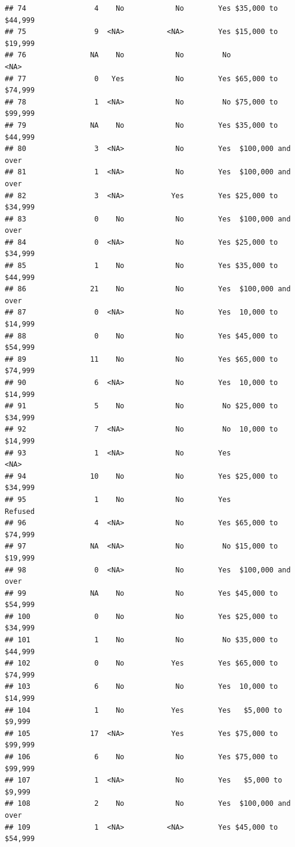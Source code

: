 \documentclass[man]{apa6}
\begin{document}
\begin{verbatim}
## 74                4    No            No        Yes $35,000 to $44,999
## 75                9  <NA>          <NA>        Yes $15,000 to $19,999
## 76               NA    No            No         No               <NA>
## 77                0   Yes            No        Yes $65,000 to $74,999
## 78                1  <NA>            No         No $75,000 to $99,999
## 79               NA    No            No        Yes $35,000 to $44,999
## 80                3  <NA>            No        Yes  $100,000 and over
## 81                1  <NA>            No        Yes  $100,000 and over
## 82                3  <NA>           Yes        Yes $25,000 to $34,999
## 83                0    No            No        Yes  $100,000 and over
## 84                0  <NA>            No        Yes $25,000 to $34,999
## 85                1    No            No        Yes $35,000 to $44,999
## 86               21    No            No        Yes  $100,000 and over
## 87                0  <NA>            No        Yes  10,000 to $14,999
## 88                0    No            No        Yes $45,000 to $54,999
## 89               11    No            No        Yes $65,000 to $74,999
## 90                6  <NA>            No        Yes  10,000 to $14,999
## 91                5    No            No         No $25,000 to $34,999
## 92                7  <NA>            No         No  10,000 to $14,999
## 93                1  <NA>            No        Yes               <NA>
## 94               10    No            No        Yes $25,000 to $34,999
## 95                1    No            No        Yes            Refused
## 96                4  <NA>            No        Yes $65,000 to $74,999
## 97               NA  <NA>            No         No $15,000 to $19,999
## 98                0  <NA>            No        Yes  $100,000 and over
## 99               NA    No            No        Yes $45,000 to $54,999
## 100               0    No            No        Yes $25,000 to $34,999
## 101               1    No            No         No $35,000 to $44,999
## 102               0    No           Yes        Yes $65,000 to $74,999
## 103               6    No            No        Yes  10,000 to $14,999
## 104               1    No           Yes        Yes   $5,000 to $9,999
## 105              17  <NA>           Yes        Yes $75,000 to $99,999
## 106               6    No            No        Yes $75,000 to $99,999
## 107               1  <NA>            No        Yes   $5,000 to $9,999
## 108               2    No            No        Yes  $100,000 and over
## 109               1  <NA>          <NA>        Yes $45,000 to $54,999

\end{verbatim}
\end{document}
